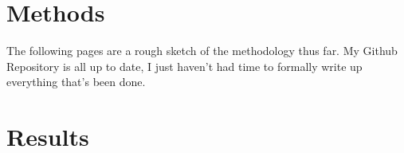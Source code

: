 \documentclass[article,12pt]{article}
\numberwithin{equation}{section}
\begin{document}
\section*{Methods}
The following pages are a rough sketch of the methodology thus far. My Github Repository is all up to date, I just haven't had time to formally write up everything that's been done.  
\newpage~\newpage~\newpage~\newpage

\section*{Results}
\begin{adjustwidth}{-.55in}{-.55in}	

	
\end{adjustwidth}
\end{document}
